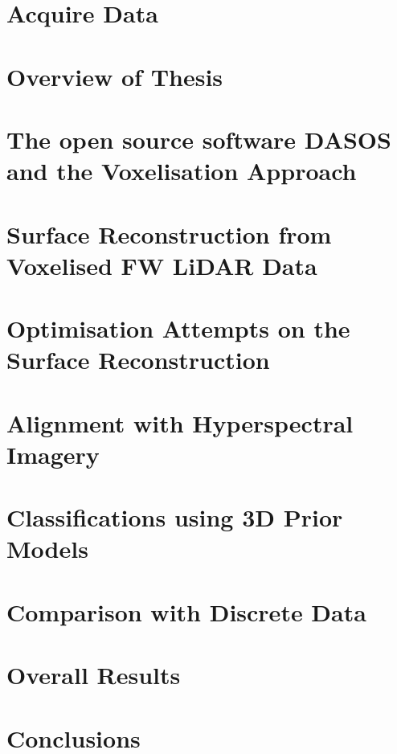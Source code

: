 \documentclass[11pt,nofootinbib]{report}
\begin{document}
    \chapter{Acquire Data}\label{AcquireData}
	    \newpage
	\chapter{Overview of Thesis}\label{PipeLine}
		

	\chapter{The open source software DASOS and the Voxelisation Approach}\label{DASOS_Voxelisation}
	\newpage


		 		
	\chapter{Surface Reconstruction from Voxelised FW LiDAR Data}\label{Visualisations}
		
		\newpage
    \chapter{Optimisation Attempts on the Surface Reconstruction}\label{Optimisations}
		 
			 \newpage
	\chapter{Alignment with Hyperspectral Imagery}\label{Alignment}
		\newpage		
	\chapter{Classifications using 3D Prior Models}\label{Classifications}
		
		\newpage
	\chapter{Comparison with Discrete Data}\label{ComparisonDiscreteVsFW}
	    
	    \newpage
	\chapter{Overall Results}\label{Results}
		
		\newpage
	\chapter{Conclusions}\label{Conclusions}
		
		\newpage
\end{document}
